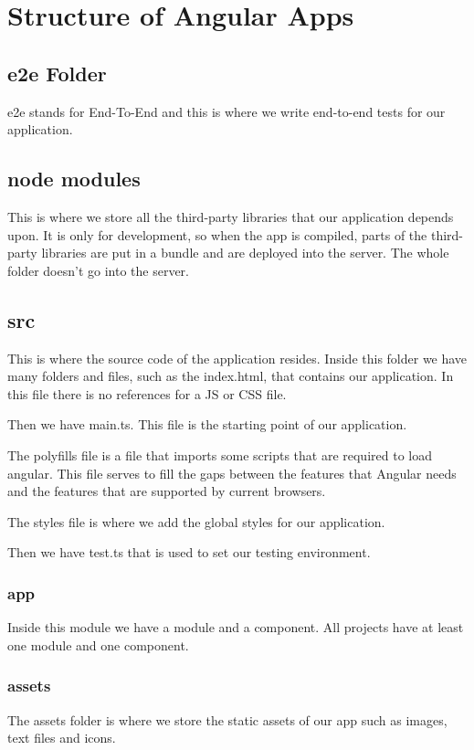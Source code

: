 \chapter{Structure of Angular Apps}
\section{e2e Folder}
e2e stands for End-To-End and this is where we write end-to-end tests for our application.

\section{node modules}
This is where we store all the third-party libraries that our application depends upon. It is only for development, so when the app is compiled, parts of the third-party libraries are put in a bundle and are deployed into the server. The whole folder doesn't go into the server.

\section{src}
This is where the source code of the application resides. Inside this folder we have many folders and files, such as the index.html, that contains our application. In this file there is no references for a JS or CSS file.

Then we have main.ts. This file is the starting point of our application.

The polyfills file is a file that imports some scripts that are required to load angular. This file serves to fill the gaps between the features that Angular needs and the features that are supported by current browsers.

The styles file is where we add the global styles for our application.

Then we have test.ts that is used to set our testing environment.

\subsection{app}
Inside this module we have a module and a component. All projects have at least one module and one component.

\subsection{assets}
The assets folder is where we store the static assets of our app such as images, text files and icons.

